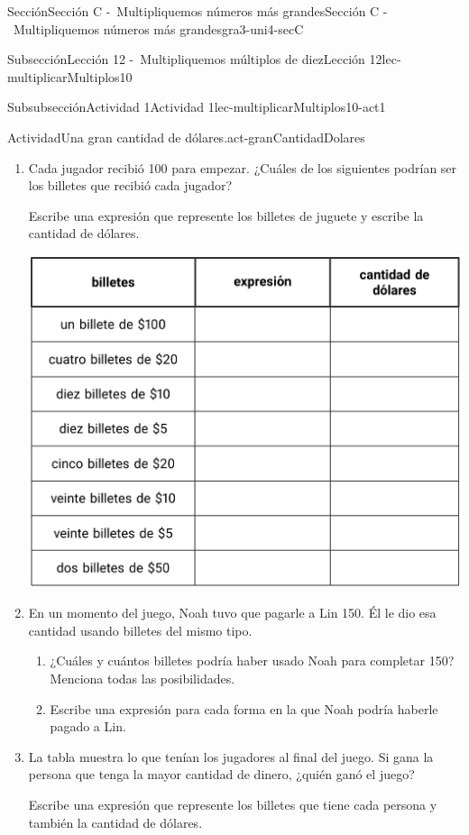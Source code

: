 \documentclass[twoside,10pt,]{article}
\begin{document}
\begin{sectionptx}{Sección}{Sección C -~Multipliquemos números más grandes}{}{Sección C -~Multipliquemos números más grandes}{}{}{gra3-uni4-secC}
\begin{subsectionptx}{Subsección}{Lección 12 -~Multipliquemos múltiplos de diez}{}{Lección 12}{}{}{lec-multiplicarMultiplos10}
\begin{subsubsectionptx}{Subsubsección}{Actividad 1}{}{Actividad 1}{}{}{lec-multiplicarMultiplos10-act1}
\begin{activity}{Actividad}{Una gran cantidad de dólares.}{act-granCantidadDolares}
\begin{enumerate}
\item{}Cada jugador recibió \textdollar{}100 para empezar. ¿Cuáles de los siguientes podrían ser los billetes que recibió cada jugador?%
\par
Escribe una expresión que represente los billetes de juguete y escribe la cantidad de dólares.%
\begin{image}{0}{1}{0}{}%
\includegraphics[width=\linewidth]{external/tikz-source/unaGranCantidadDeDolares-tab1.pdf}
\end{image}%
\item{}En un momento del juego, Noah tuvo que pagarle a Lin \textdollar{}150. Él le dio esa cantidad usando billetes del mismo tipo.%
%
\begin{enumerate}
\item{}¿Cuáles y cuántos billetes podría haber usado Noah para completar \textdollar{}150? Menciona todas las posibilidades.%
\item{}Escribe una expresión para cada forma en la que Noah podría haberle pagado a Lin.%
\end{enumerate}
\item{}La tabla muestra lo que tenían los jugadores al final del juego. Si gana la persona que tenga la mayor cantidad de dinero, ¿quién ganó el juego?%
\par
Escribe una expresión que represente los billetes que tiene cada persona y también la cantidad de dólares.%
\begin{image}{0}{1}{0}{}%

\end{image}
\end{enumerate}
\end{activity}
\end{subsubsectionptx}
\end{subsectionptx}
\end{sectionptx}
\end{document}
